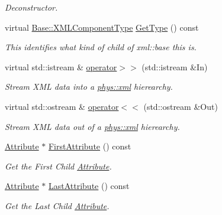 \begin{DoxyCompactItemize}
\begin{DoxyCompactList}\small\item\em Deconstructor. \item\end{DoxyCompactList}\item 
virtual \hyperlink{classphys_1_1xml_1_1Base_a62ba0484b5ecb502f9ae9d82d3720320}{Base::XMLComponentType} \hyperlink{classphys_1_1xml_1_1Element_a6c79d4fef50615ba719b07f287a87b19}{GetType} () const 
\begin{DoxyCompactList}\small\item\em This identifies what kind of child of xml::base this is. \item\end{DoxyCompactList}\item 
virtual std::istream \& \hyperlink{classphys_1_1xml_1_1Element_a993da7da752e79b693bc377909e66b6a}{operator$>$$>$} (std::istream \&In)
\begin{DoxyCompactList}\small\item\em Stream XML data into a \hyperlink{namespacephys_1_1xml}{phys::xml} hierearchy. \item\end{DoxyCompactList}\item 
virtual std::ostream \& \hyperlink{classphys_1_1xml_1_1Element_aaff5ca8ec0e4219471b6aebbbc65cab6}{operator$<$$<$} (std::ostream \&Out)
\begin{DoxyCompactList}\small\item\em Stream XML data out of a \hyperlink{namespacephys_1_1xml}{phys::xml} hierearchy. \item\end{DoxyCompactList}\item 
\hyperlink{classphys_1_1xml_1_1Attribute}{Attribute} $\ast$ \hyperlink{classphys_1_1xml_1_1Element_ab9b6dcbf0a0cc22d3931c8af2b5d33d4}{FirstAttribute} () const 
\begin{DoxyCompactList}\small\item\em Get the First Child \hyperlink{classphys_1_1xml_1_1Attribute}{Attribute}. \item\end{DoxyCompactList}\item 
\hyperlink{classphys_1_1xml_1_1Attribute}{Attribute} $\ast$ \hyperlink{classphys_1_1xml_1_1Element_ad37a4416a88fcbe81d43d10b5ee99a88}{LastAttribute} () const 
\begin{DoxyCompactList}\small\item\em Get the Last Child \hyperlink{classphys_1_1xml_1_1Attribute}{Attribute}. \item\end{DoxyCompactList}\item 

\end{DoxyCompactItemize}
